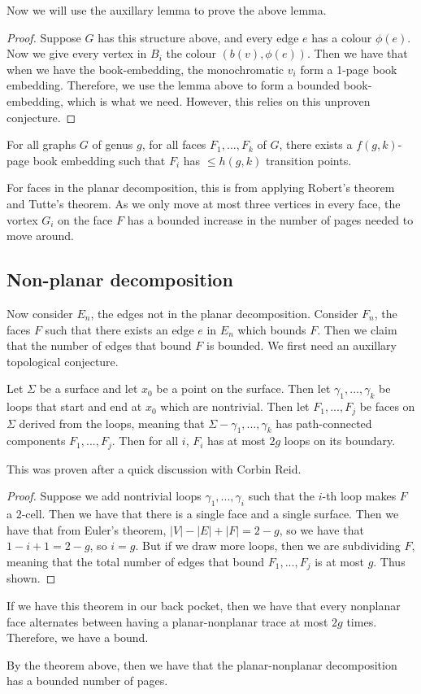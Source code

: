 Now we will use the auxillary lemma to prove the above lemma.
\begin{proof}
	Suppose $G$ has this structure above, and every edge $e$ has a colour $\phi(e)$. 
	Now we give every vertex in $B_i$ the colour $(b(v),  \phi(e))$. Then we have that when we have the book-embedding, the monochromatic $v_i$ form a 1-page book embedding. Therefore, we use the lemma above to form a bounded book-embedding, which is what we need. However, this relies on this unproven conjecture.
\end{proof}

\begin{theorem}
	For all graphs $G$ of genus $g$, for all faces $F_1, ..., F_k$ of $G$, there exists a $f(g, k)$-page book embedding such that $F_i$ has $\leq h(g, k)$ transition points. 
\end{theorem}

For faces in the planar decomposition, this is from applying Robert's theorem and Tutte's theorem. As we only move at most three vertices in every face, the vortex $G_i$ on the face $F$ has a bounded increase in the number of pages needed to move around. 

\subsection{Non-planar decomposition}
Now consider $E_n$, the edges not in the planar decomposition. Consider $F_n$, the faces $F$ such that there exists an edge $e$ in $E_n$ which bounds $F$. Then we claim that the number of edges that bound $F$ is bounded. We first need an auxillary topological conjecture. 

\begin{lemma}
	Let $\Sigma$ be a surface and let $x_0$ be a point on the surface. Then let $\gamma_1, ..., \gamma_k$ be loops that start and end at $x_0$ which are nontrivial. Then let $F_1, ..., F_j$ be faces on $\Sigma$ derived from the loops, meaning that $\Sigma - \gamma_1, ..., \gamma_k$ has path-connected components $F_1, ..., F_j$. Then for all $i$, $F_i$ has at most $2g$ loops on its boundary.
\end{lemma}

This was proven after a quick discussion with Corbin Reid.

\begin{proof}
	Suppose we add nontrivial loops $\gamma_1, ..., \gamma_i$ such that the $i$-th loop makes $F$ a $2$-cell. Then we have that there is a single face and a single surface. Then we have that from Euler's theorem, $|V| - |E| + |F| = 2 - g$, so we have that $ 1 - i + 1 = 2 - g$, so $i = g$. But if we draw more loops, then we are subdividing $F$, meaning that the total number of edges that bound $F_1, ..., F_j$ is at most $g$. Thus shown.
\end{proof}

If we have this theorem in our back pocket, then we have that every nonplanar face alternates between having a planar-nonplanar trace at most $2g$ times. Therefore, we have a bound. 

By the theorem above, then we have that the planar-nonplanar decomposition has a bounded number of pages. 